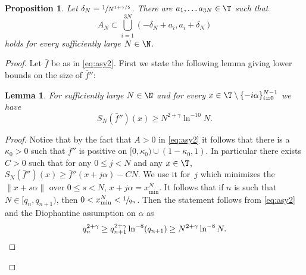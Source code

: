 \documentclass[10pt]{amsart}
\theoremstyle{definition}
\theoremstyle{plain}
\newtheorem{lemma}[definition]{Lemma}
\newtheorem{proposition}[definition]{Proposition}
\begin{document}
\begin{proposition} \label{lemma.delta}
Let $\delta_N=\sfrac{1}{N^{1+\gamma/5}}$. There are $a_1,\ldots a_{3N}\in \T$ such that
\begin{equation}\label{eq:an}
A_N\subset \bigcup_{i=1}^{3N}(-\delta_N+a_i,a_i+\delta_N)
\end{equation}
holds for every sufficiently large $N\in \N$.
\end{proposition}
\begin{proof}
Let $\bar{f}$ be as in \eqref{eq:asy2}. First we state the following lemma giving lower bounds on the size of $\bar{f}{}''$:
\begin{lemma}\label{lem:DK} For sufficiently large $N\in \N$ and for every $x\in \T\setminus\{-i\alpha\}_{i=0}^{N-1}$ we have
\[
S_N(\bar{f}{}'')(x)\geq N^{2+\gamma}\ln^{-10}N.
\]
\end{lemma}
\begin{proof} { Notice that by the fact that $A>0$ in \eqref{eq:asy2} it follows that there is a $\kappa_0>0$ such that $\bar{f}{}''$ is positive on $[0,\kappa_0)\cup (1-\kappa_0,1)$. In particular there exists $C>0$ such that for any $0\leq j<N$ and any $x\in \T$, $S_N(\bar{f}{}'')(x)\geq \bar{f}{}''(x+j\alpha)- C N$. We use it for~$j$ which minimizes the $\|x+s\alpha\|$ over $0\leq s<N$, \ie $x+j\alpha=x^N_{\min}$}. It follows that if $n$ is such that $N\in [q_n,q_{n+1})$, then $0<x^N_{\min}<\sfrac{1}{q_n}$. Then the statement follows from \eqref{eq:asy2} and the Diophantine assumption on $\alpha$ as
\[
q_n^{2+\gamma}\geq q_{n+1}^{2+\gamma}\ln^{-8}(q_{n+1})\geq N^{2+\gamma}\ln^{-8}N.\qedhere
\]
\end{proof}


\end{proof}
\end{document}

